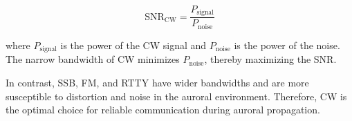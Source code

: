 \[
\text{SNR}_{\text{CW}} = \frac{P_{\text{signal}}}{P_{\text{noise}}}
\]

where \( P_{\text{signal}} \) is the power of the CW signal and \( P_{\text{noise}} \) is the power of the noise. The narrow bandwidth of CW minimizes \( P_{\text{noise}} \), thereby maximizing the SNR.

In contrast, SSB, FM, and RTTY have wider bandwidths and are more susceptible to distortion and noise in the auroral environment. Therefore, CW is the optimal choice for reliable communication during auroral propagation.

